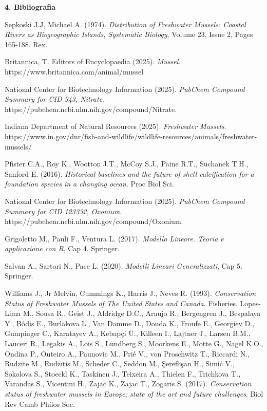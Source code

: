 \documentclass{article} %
\begin{document}
\newpage
\begin{flushleft}
    \vskip 70pt
    \textbf{\Huge 4. \: Bibliografia}
\end{flushleft}
\renewcommand{\refname}{}
\begin{thebibliography}{9}

Sepkoski J.J, Michael A. (1974). \textit{Distribution of Freshwater Mussels: Coastal Rivers as Biogeographic Islands, Systematic Biology}, Volume 23, Issue 2, Pages 165-188. Rex.

Britannica, T. Editors of Encyclopaedia (2025). \textit{Mussel}. \\https://www.britannica.com/animal/mussel

National Center for Biotechnology Information (2025). \textit{PubChem Compound Summary for CID 943, Nitrate}. \\https://pubchem.ncbi.nlm.nih.gov/compound/Nitrate.

Indiana Department of Natural Resources (2025). \textit{Freshwater Mussels}. \\https://www.in.gov/dnr/fish-and-wildlife/wildlife-resources/animals/freshwater-mussels/

Pfister C.A., Roy K., Wootton J.T., McCoy S.J., Paine R.T., Suchanek T.H., Sanford E. (2016). \textit{Historical baselines and the future of shell calcification for a foundation species in a changing ocean}. Proc Biol Sci.

National Center for Biotechnology Information (2025). \textit{PubChem Compound Summary for CID 123332, Oxonium}.\\ https://pubchem.ncbi.nlm.nih.gov/compound/Oxonium.

Grigoletto M., Pauli F., Ventura L. (2017). \textit{Modello Lineare. Teoria e applicazione con R}, Cap 4. Springer.

Salvan A., Sartori N., Pace L. (2020). \textit{Modelli Lineari Generalizzati}, Cap 5. Springer.

Williams J., Jr Melvin, Cummings K., Harris J., Neves R. (1993). \textit{Conservation Status of Freshwater Mussels of The United States and Canada}. Fisheries. 
Lopes-Lima M., Sousa R., Geist J., Aldridge D.C., Araujo R., Bergengren J., Bespalaya Y., Bódis E., Burlakova L., Van Damme D., Douda K., Froufe E., Georgiev D., Gumpinger C., Karatayev A., Kebapçi Ü., Killeen I., Lajtner J., Larsen B.M., Lauceri R., Legakis A., Lois S., Lundberg S., Moorkens E., Motte G., Nagel K.O., Ondina P., Outeiro A., Paunovic M., Prié V., von Proschwitz T., Riccardi N., Rudzīte M., Rudzītis M., Scheder C., Seddon M., Şereflişan H., Simić V., Sokolova S., Stoeckl K., Taskinen J., Teixeira A., Thielen F., Trichkova T., Varandas S., Vicentini H., Zajac K., Zajac T., Zogaris S. (2017). \textit{Conservation status of freshwater mussels in Europe: state of the art and future challenges}. Biol Rev Camb Philos Soc.



\end{thebibliography}
\end{document}
